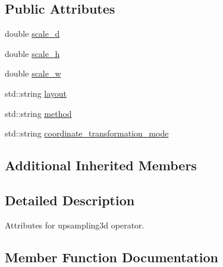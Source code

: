 \subsection*{Public Attributes}
\begin{DoxyCompactItemize}
\item 
double \hyperlink{structtvm_1_1relay_1_1UpSampling3DAttrs_a73f52d511b9d564724930bc40497cee7}{scale\+\_\+d}
\item 
double \hyperlink{structtvm_1_1relay_1_1UpSampling3DAttrs_a8ce387249c84609450b32fd69d719366}{scale\+\_\+h}
\item 
double \hyperlink{structtvm_1_1relay_1_1UpSampling3DAttrs_a270613b4109d2b24766b7bfbac2539c1}{scale\+\_\+w}
\item 
std\+::string \hyperlink{structtvm_1_1relay_1_1UpSampling3DAttrs_af8891c263011a72ee4989a601b860f08}{layout}
\item 
std\+::string \hyperlink{structtvm_1_1relay_1_1UpSampling3DAttrs_a86334960861ecfd8dbd6cc61631b4647}{method}
\item 
std\+::string \hyperlink{structtvm_1_1relay_1_1UpSampling3DAttrs_af1e45a8c9fe5959dc0570a6993a68164}{coordinate\+\_\+transformation\+\_\+mode}
\end{DoxyCompactItemize}
\subsection*{Additional Inherited Members}


\subsection{Detailed Description}
Attributes for upsampling3d operator. 

\subsection{Member Function Documentation}
